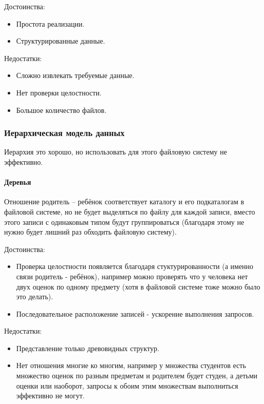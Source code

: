 Достоинства:
\begin{itemize}
	\item Простота реализации.
	\item Структурированные данные.
\end{itemize}

Недостатки:
\begin{itemize}
	\item Сложно извлекать требуемые данные.
	\item Нет проверки целостности.
	\item Большое количество файлов.
\end{itemize}

\subsubsection{Иерархическая модель данных}

\begin{remark}
	Иерархия это хорошо, но использовать для этого файловую систему не эффективно.
\end{remark}

\paragraph{Деревья}
Отношение родитель -- ребёнок соответствует каталогу и его подкаталогам в файловой системе,  но не
будет выделяться по файлу для каждой записи, вместо этого записи с одинаковым типом будут
группироваться (благодаря этому не нужно будет лишний раз обходить файловую систему).

Достоинства:
\begin{itemize}
	\item Проверка целостности появляется благодаря стуктурированности (а именно связи родитель - ребёнок),
	      например можно проверять что у человека нет двух оценок по одному предмету (хотя в файловой системе
	      тоже можно было это делать).
	\item Последовательное расположение записей - ускорение выполнения запросов.
\end{itemize}

Недостатки:
\begin{itemize}
	\item Представление только древовидных структур.
	\item Нет отношения многие ко многим, например у множества студентов есть множество оценок по разным
	      предметам и родителем будет студен, а детьми оценки или наоборот, запросы к обоим этим множествам
	      выполниться эффективно не могут.
\end{itemize}

